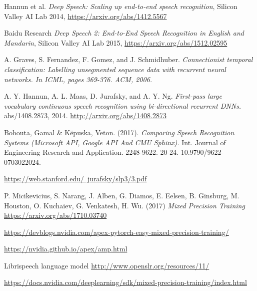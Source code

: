 \documentclass[licencjacka,en]{pracamgr}
\begin{document}
	\begin{thebibliography}{99}
		
		 Hannun et al.
		\textit{Deep Speech: Scaling up end-to-end speech recognition}, Silicon Valley AI Lab 2014, \href{https://arxiv.org/abs/1412.5567}{https://arxiv.org/abs/1412.5567}
		
		 Baidu Research \textit{Deep Speech 2: End-to-End Speech Recognition in English and Mandarin}, Silicon Valley AI Lab 2015, \href{https://arxiv.org/abs/1512.02595}{https://arxiv.org/abs/1512.02595}
		
		 A. Graves, S. Fernandez, F. Gomez, and J. Schmidhuber. \textit{Connectionist temporal classification:
			Labelling unsegmented sequence data with recurrent neural networks. In ICML, pages 369-376. ACM, 2006.}
		
		 A. Y. Hannun, A. L. Maas, D. Jurafsky, and A. Y. Ng. \textit{First-pass large vocabulary continuous speech recognition using bi-directional recurrent DNNs.} abs/1408.2873, 2014. \href{http://arxiv.org/abs/1408.2873}{http://arxiv.org/abs/1408.2873}
		
		 Bohouta, Gamal \& Këpuska, Veton. (2017). \textit{Comparing Speech Recognition Systems (Microsoft API, Google API And CMU Sphinx).} Int. Journal of Engineering Research and Application. 2248-9622. 20-24. 10.9790/9622-0703022024.
		
		 \href{https://web.stanford.edu/~jurafsky/slp3/3.pdf}{https://web.stanford.edu/~jurafsky/slp3/3.pdf}
		
		  P. Micikevicius, S. Narang, J. Alben, G. Diamos, E. Eelsen, B. Ginsburg, M. Houston, O. Kuchaiev, G. Venkatesh, H. Wu. (2017) \textit{Mixed Precision Training}
		\href{https://arxiv.org/abs/1710.03740}{https://arxiv.org/abs/1710.03740}
		
		 \href{https://devblogs.nvidia.com/apex-pytorch-easy-mixed-precision-training/}{https://devblogs.nvidia.com/apex-pytorch-easy-mixed-precision-training/}
		
		 \href{https://nvidia.github.io/apex/amp.html}{https://nvidia.github.io/apex/amp.html}
		
		 Librispeech language model
		\href{http://www.openslr.org/resources/11/}{http://www.openslr.org/resources/11/}
		
		 \href{https://docs.nvidia.com/deeplearning/sdk/mixed-precision-training/index.html}{https://docs.nvidia.com/deeplearning/sdk/mixed-precision-training/index.html}
		

\end{thebibliography}
\end{document}
